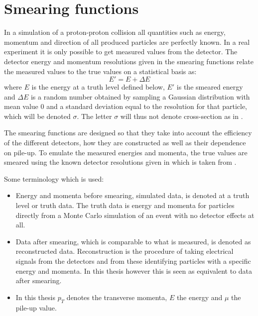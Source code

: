 \section{Smearing functions}\label{sec:smear}
In a simulation of a proton-proton collision all quantities such as energy, momentum and direction of all produced particles are perfectly known. In a real experiment it is only possible to get measured values from the detector. The detector energy and momentum resolutions given in the smearing functions relate the measured values to the true values on a statistical basis as:
\begin{equation}\label{eq:smear}
E' = E + \Delta E 
\end{equation}
where $E$ is the energy at a truth level defined below, $E'$ is the smeared energy and $\Delta E$ is a random number obtained by sampling a Gaussian distribution with mean value 0 and a standard deviation equal to the resolution for that particle, which will be denoted $\sigma$. The letter  $\sigma$ will thus not denote cross-section as in .

The smearing functions are designed so that they take into account the efficiency of the different detectors, how they are constructed as well as their dependence on pile-up. To emulate the measured energies and momenta, the true values are smeared using the known detector resolutions given in  which is taken from \citep{ATL-PHYS-PUB-2013-004}. 

Some terminology which is used:
\begin{itemize}
\item Energy and momenta before smearing, simulated data, is denoted at a truth level or truth data. The truth data is energy and momenta for particles directly from a Monte Carlo simulation of an event with no detector effects at all.
\item Data after smearing, which is comparable to what is measured, is denoted as reconstructed data. Reconstruction is the procedure of taking electrical signals from the detectors and from these identifying particles with a specific energy and momenta. In this thesis however this is seen as equivalent to data after smearing.
\item In this thesis $p_T$ denotes the transverse momenta, $E$ the energy and $\mu$ the pile-up value.
\end{itemize}

